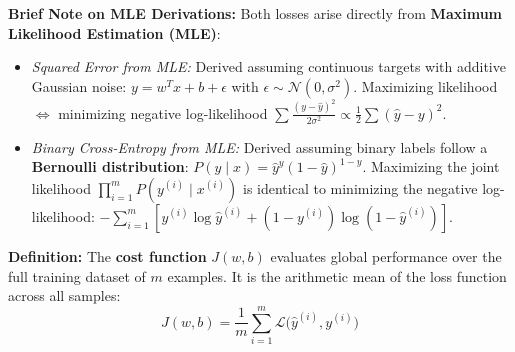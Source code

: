 \documentclass[10pt,a4paper]{article}
\begin{document}
\begin{tcolorbox}[
    colframe=accentred,
    colback=white,
    arc=1.5mm,
    boxrule=0.5pt,
    left=6pt, right=6pt, top=2.5pt, bottom=2.5pt
]
\textbf{Brief Note on MLE Derivations:} Both losses arise directly from \textbf{Maximum Likelihood Estimation (MLE)}:
\begin{itemize}[leftmargin=10pt, itemsep=1pt, topsep=1pt]
    \item \textit{Squared Error from MLE:} Derived assuming continuous targets with additive Gaussian noise: $y = w^T x + b + \epsilon$ with $\epsilon \sim \mathcal{N}(0, \sigma^2)$. Maximizing likelihood $\iff$ minimizing negative log-likelihood $\sum \frac{(y - \hat{y})^2}{2\sigma^2} \propto \frac{1}{2}\sum(\hat{y} - y)^2$.
    \item \textit{Binary Cross-Entropy from MLE:} Derived assuming binary labels follow a \textbf{Bernoulli distribution}: $P(y \mid x) = \hat{y}^y (1 - \hat{y})^{1-y}$. Maximizing the joint likelihood $\prod_{i=1}^m P(y^{(i)} \mid x^{(i)})$ is identical to minimizing the negative log-likelihood: $-\sum_{i=1}^m [y^{(i)}\log\hat{y}^{(i)} + (1 - y^{(i)})\log(1 - \hat{y}^{(i)})]$.
\end{itemize}
\end{tcolorbox}

\newpage

\par\vspace{2pt}
\textbf{Definition:} The \textbf{cost function} $J(w, b)$ evaluates global performance over the full training dataset of $m$ examples. It is the arithmetic mean of the loss function across all samples:
\[
J(w, b) = \frac{1}{m} \sum_{i=1}^m \mathcal{L}\big(\hat{y}^{(i)}, y^{(i)}\big)
\]
\end{document}
